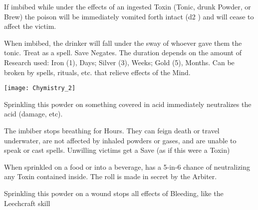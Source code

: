 If imbibed while under the effects of an ingested Toxin (Tonic, drunk Powder, or Brew) the poison will be immediately vomited forth intact (d2 \UD) and will cease to affect the victim.  

\CHYMISTRY[
  Name=Philter of von Fuchs,
  Link=chymistry-philter-von-Fuchs,
  Cost=See Below,
  Duration=See Below,
  Toxin=Yes,
  Narcotic=No 
]

When imbibed, the drinker will fall under the sway of whoever gave them the tonic.  Treat as a  spell.  Save Negates.  The duration depends on the amount of Research used:  Iron (1), Days; Silver (3), Weeks; Gold (5), Months.  Can be broken by spells, rituals, etc. that relieve effects of the Mind.

  \begin{center}
  \texttt{[image: Chymistry\_2]}
  \end{center}



  \CHYMISTRY[
    Name=Dastin's Basic Talc,
    Link=chymistry-dastins-basic-talc,
    Cost=Iron (1 Research;100\FE),
    Duration=0 ,
    Toxin=No,
    Narcotic=No 
  ]


  Sprinkling this powder on something covered in acid immediately neutralizes the acid (damage, etc).


  \CHYMISTRY[
    Name=Mermaid's Kiss,
    Link=chymistry-mermaids-kiss,
    Cost=Silver (3 Research;300\AG),
    Duration=0 ,
    Toxin=Yes,
    Narcotic=No 
  ]


  The imbiber stops breathing for Hours.  They can feign death or travel underwater, are not affected by inhaled powders or gases, and are unable to speak or cast spells.  Unwilling victims get a Save (as if this were a Toxin)



  \CHYMISTRY[
    Name=Powdered Bezoar,
    Link=chymistry-powdered-bezoar,
    Cost=Iron (1 Research;100\FE),
    Duration=0 ,
    Toxin=No,
    Narcotic=No 
  ]


  When sprinkled on a food or into a beverage, has a 5-in-6 chance of neutralizing any Toxin contained inside.  The roll is made in secret by the Arbiter.


  \CHYMISTRY[
    Name=Woundseal,
    Link=chymistry-woundseal,
    Cost=Iron (1 Research;100\FE),
    Duration=0 ,
    Toxin=No,
    Narcotic=No 
  ]


  Sprinkling this powder on a wound stops all effects of Bleeding, like the Leechcraft skill 



